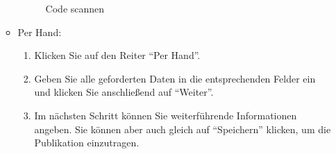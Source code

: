 \begin{enumerate}
\begin{itemize}
\begin{figure}[h!]
 \centering
 \caption{Code scannen}
 \label{figure3}
\end{figure}  
        \item Per Hand:
        \begin{enumerate}
            \item Klicken Sie auf den Reiter \enquote{Per Hand}.
            \item Geben Sie alle geforderten Daten in die entsprechenden Felder ein und klicken Sie anschließend auf \enquote{Weiter}. 
            \item Im nächsten Schritt können Sie weiterführende Informationen angeben. Sie können aber auch gleich auf \enquote{Speichern} klicken, um die Publikation einzutragen.
        \end{enumerate}        
    \end{itemize}
\end{enumerate}
